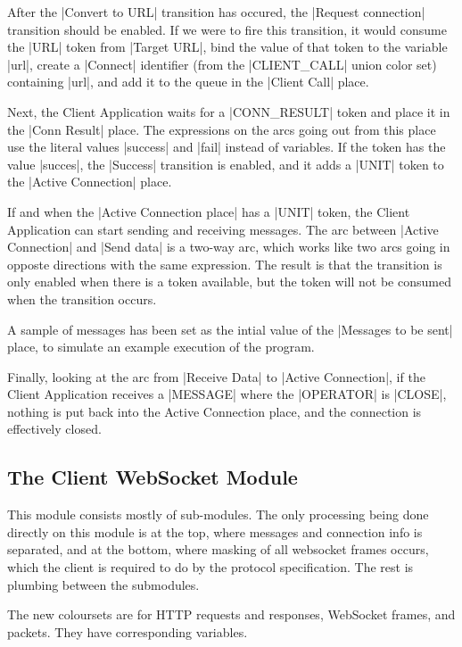 		After the |Convert to URL| transition has occured, the |Request connection|
		transition should be enabled. If we were to fire this transition, it would
		consume the |URL| token from |Target URL|, bind the value of that token to the
		variable |url|, create a |Connect| identifier (from the |CLIENT_CALL| union
		color set) containing |url|, and add it to the queue in the |Client Call|
		place.
		
		Next, the Client Application waits for a |CONN_RESULT| token and place it in
		the |Conn Result| place. The expressions on the arcs going out from this
		place use the literal values |success| and |fail| instead of variables. If
		the token has the value |succes|, the |Success| transition is enabled, and it
		adds a |UNIT| token to the |Active Connection| place.
		
		If and when the |Active Connection place| has a |UNIT| token, the
		Client Application can start sending and receiving messages. The arc between
		|Active Connection| and |Send data| is a two-way arc, which works like two
		arcs going in opposte directions with the same expression. The result is that
		the transition is only enabled when there is a token available, but the token
		will not be consumed when the transition occurs. 
		
		A sample of messages has been set as the intial value of the |Messages to be sent|
		place, to simulate an example execution of the program.
		
		Finally, looking at the arc from |Receive Data| to |Active Connection|, if the
		Client Application receives a |MESSAGE| where the |OPERATOR| is |CLOSE|,
		nothing is put back into the Active Connection place, and the connection is
		effectively closed.

\subsection{The Client WebSocket Module}


	This module consists mostly of sub-modules. The only processing
	being done directly on this module is at the top, where messages and
	connection info is separated, and at the bottom, where
	masking of all websocket frames occurs, which the client is required to do by
	the protocol specification. The rest is plumbing between the submodules.
	
	The new coloursets are for HTTP requests and responses, WebSocket frames, and
	packets. They have corresponding variables. 
	
